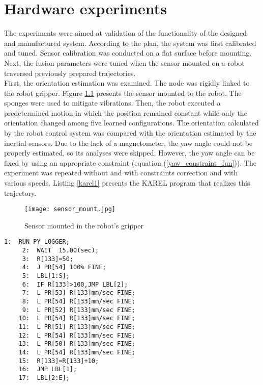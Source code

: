 \chapter{Hardware experiments}

The experiments were aimed at validation of the functionality of the designed and manufactured system. According to the plan, the system was first calibrated and tuned. Sensor calibration was conducted on a flat surface before mounting. Next, the fusion parameters were tuned when the sensor mounted on a robot traversed previously prepared trajectories.\\

First, the orientation estimation was examined. The node was rigidly linked to the robot gripper. Figure \ref{sensor_mount} presents the sensor mounted to the robot. The sponges were used to mitigate vibrations. Then, the robot executed a predetermined motion in which the position remained constant while only the orientation changed among five learned configurations. The orientation calculated by the robot control system was compared with the orientation estimated by the inertial sensors. Due to the lack of a magnetometer, the yaw angle could not be properly estimated, so its analyses were skipped. However, the yaw angle can be fixed by using an appropriate constraint (equation (\ref{yaw_constraint_fun})). The experiment was repeated without and with constraints correction and with various speeds. Listing \ref{karel1} presents the KAREL program that realizes this trajectory.
 
 \begin{figure}[!h]
	\centering
	\texttt{[image: sensor\_mount.jpg]}
	\caption{Sensor mounted in the robot's gripper}
	\label{sensor_mount}
\end{figure}
 
 \begin{lstlisting}[caption={The KAREL program realizing an orientation changes}, captionpos=t, label=karel1]
	 1:  RUN PY_LOGGER;
	 2:  WAIT  15.00(sec);
	 3:  R[133]=50;
	 4:  J PR[54] 100% FINE;
	 5:  LBL[1:S];
	 6:  IF R[133]>100,JMP LBL[2];
	 7:  L PR[53] R[133]mm/sec FINE;
	 8:  L PR[54] R[133]mm/sec FINE;
	 9:  L PR[52] R[133]mm/sec FINE;
	10:  L PR[54] R[133]mm/sec FINE;
	11:  L PR[51] R[133]mm/sec FINE;
	12:  L PR[54] R[133]mm/sec FINE;
	13:  L PR[50] R[133]mm/sec FINE;
	14:  L PR[54] R[133]mm/sec FINE;
	15:  R[133]=R[133]+10;
	16:  JMP LBL[1];
	17:  LBL[2:E];
 \end{lstlisting}

